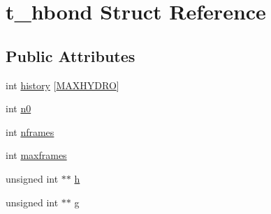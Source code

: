 \hypertarget{structt__hbond}{\section{t\-\_\-hbond \-Struct \-Reference}
\label{structt__hbond}
}
\subsection*{\-Public \-Attributes}
\begin{DoxyCompactItemize}
\item 
int \hyperlink{structt__hbond_a51c4794e821837922fd035142f9459ae}{history} \mbox{[}\hyperlink{gmx__hbond_8c_a00d2571ef1dc08c87d972f5c06990fc2}{\-M\-A\-X\-H\-Y\-D\-R\-O}\mbox{]}
\item 
int \hyperlink{structt__hbond_a9824d6f3b7035dfde2a4996b65f65613}{n0}
\item 
int \hyperlink{structt__hbond_a1d43963290a2aa7894d60cbd4bb1f2b0}{nframes}
\item 
int \hyperlink{structt__hbond_a479a04e9b60612ffcef8514673862665}{maxframes}
\item 
unsigned int $\ast$$\ast$ \hyperlink{structt__hbond_a9d5d8b9047649f6bfc0d10414036a67c}{h}
\item 
unsigned int $\ast$$\ast$ \hyperlink{structt__hbond_a3be48d0bb46c6f5ba823b88dc8ae38bb}{g}
\end{DoxyCompactItemize}


